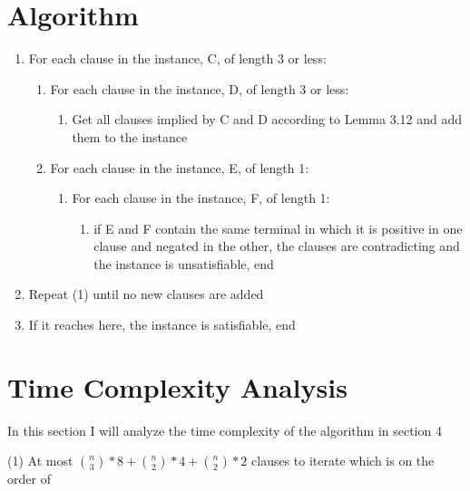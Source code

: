 \documentclass[manuscript]{acmart}
\begin{document}
    \section{Algorithm}

    \begin{enumerate}
        \item For each clause in the instance, C, of length 3 or less:
        \begin{enumerate}
            \item For each clause in the instance, D, of length 3 or less:
            \begin{enumerate}
                \item Get all clauses implied by C and D according to Lemma 3.12 and add them to the instance
            \end{enumerate}
            \item For each clause in the instance, E, of length 1:
            \begin{enumerate}
                \item For each clause in the instance, F, of length 1:
                \begin{enumerate}
                    \item if E and F contain the same terminal in which it is 
                    positive in one clause and negated in the other, the 
                    clauses are contradicting and the instance is unsatisfiable, end
                \end{enumerate}
            \end{enumerate}
        \end{enumerate}
        \item Repeat (1) until no new clauses are added
        \item If it reaches here, the instance is satisfiable, end
    \end{enumerate}

    \section{Time Complexity Analysis}

    In this section I will analyze the time complexity of the algorithm in section 4

    (1) At most ${n \choose 3}*8 + {n \choose 2}*4 + {n \choose 2}*2$ clauses to iterate which is on the order of
\end{document}
